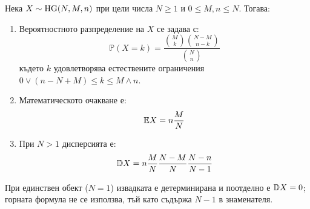 \begin{prop}
Нека $X \sim \operatorname{HG}(N, M, n)$ при цели числа $N\ge 1$ и $0\le M,n\le N$. Тогава:
\begin{enumerate}
    \item[а)] Вероятностното разпределение на $X$ се задава с:
    \[
    \mathbb{P}(X = k) = \frac{\binom{M}{k} \binom{N-M}{n-k}}{\binom{N}{n}}
    \]
    където $k$ удовлетворява естествените ограничения $0 \lor (n - N + M) \le k \le M \land n$.
    \item[б)] Математическото очакване е:
    \[
    \mathbb{E} X = n \frac{M}{N}
    \]
    \item[в)] При $N>1$ дисперсията е:
    \[
    \mathbb{D} X = n \frac{M}{N} \frac{N-M}{N} \frac{N-n}{N-1}
    \]
\end{enumerate}
При единствен обект ($N=1$) извадката е детерминирана и поотделно е
$\mathbb{D} X=0$; горната формула не се използва, тъй като съдържа $N-1$ в знаменателя.
\end{prop}

